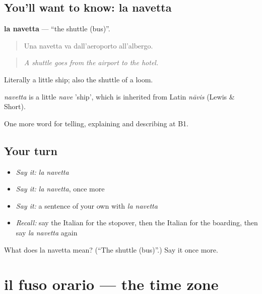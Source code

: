 \subsection*{You'll want to know: la navetta}
\textbf{la navetta} — \textquotedblleft{}the shuttle (bus)\textquotedblright{}.

\begin{quote}
Una navetta va dall'aeroporto all'albergo.
\end{quote}

\begin{quote}
\emph{A shuttle goes from the airport to the hotel.}
\end{quote}

Literally a little ship; also the shuttle of a loom.

\begin{cousinweb}
\emph{navetta} is a little \emph{nave} 'ship', which is inherited from Latin \emph{nāvis} (Lewis \& Short).
\end{cousinweb}

\begin{grammarlens}[title={What you've built}]
One more word for telling, explaining and describing at B1.
\end{grammarlens}

\subsection*{Your turn}
\begin{itemize}
\raggedright
  \item \emph{Say it:} \emph{la navetta}
  \item \emph{Say it:} \emph{la navetta}, once more
  \item \emph{Say it:} a sentence of your own with \emph{la navetta}
  \item \emph{Recall:} say the Italian for the stopover, then the Italian for the boarding, then say \emph{la navetta} again
\end{itemize}

\begin{tcolorbox}[breakable,colback=teal!4,colframe=teal!35!black,title={Before you move on}]
What does la navetta mean? (\textquotedblleft{}The shuttle (bus)\textquotedblright{}.) Say it once more.
\end{tcolorbox}
\section[il fuso orario]{il fuso orario — the time zone}

